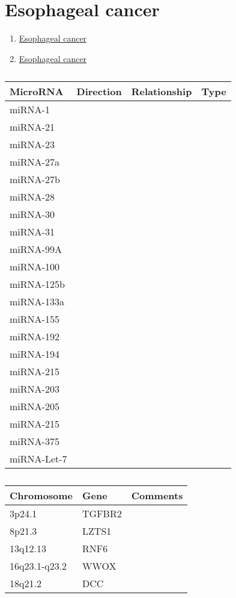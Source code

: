 
\section{Esophageal cancer}

\begin{enumerate}
\item \href{https://www.omim.org/entry/133239?search=Esophageal%20cancer&highlight=%28cancer%7Ccancerous%29%20esophageal}{Esophageal cancer}
\item \href{https://www.malacards.org/card/esophageal_cancer}{Esophageal cancer}
\end{enumerate}

\begin{table}[H]\centering
  \caption {\cite{key400} \cite{480}}
	\begin{tabular}{p{1cm}p{4cm}p{3cm}}
		 MicroRNA & Direction & Relationship & Type\\
		\hline
		miRNA-1 & & & \\
		miRNA-21 & & & \\
		miRNA-23 & & & \\
		miRNA-27a & & & \\
		miRNA-27b & & & \\
		miRNA-28 & & & \\
		miRNA-30 & & & \\
		miRNA-31 & & & \\
		miRNA-99A & & & \\
		miRNA-100 & & & \\
		miRNA-125b & & & \\
		miRNA-133a & & & \\
		miRNA-155 & & & \\
		miRNA-192 & & & \\
		miRNA-194 & & & \\
		miRNA-215 & & & \\
		miRNA-203 & & & \\
		miRNA-205 & & & \\
		miRNA-215 & & & \\
		miRNA-375 & & & \\
		\hline
		miRNA-Let-7 & & & \\
	\end{tabular}
\end{table}




\begin{table}[H]\centering
  \caption {\cite{key450}}
	\begin{tabular}{p{1cm}p{4cm}p{3cm}}
		Chromosome & Gene & Comments\\
		\hline
3p24.1 & TGFBR2 & \\	
8p21.3 &  LZTS1 & \\
13q12.13 & RNF6 & \\	
16q23.1-q23.2 & WWOX & \\ 	
18q21.2 & DCC & \\
		\hline
	\end{tabular}
\end{table}


